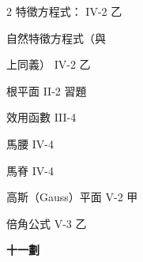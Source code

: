 \begin{multicols}{2}
\noindent 特徵方程式： \hfill IV-2 乙\par
\noindent\hspace*{1.5em} 自然特徵方程式（與\par
\noindent\hspace*{1.5em} 上同義） \hfill IV-2 乙\par
\noindent 根平面 \hfill II-2 習題\par
\noindent 效用函數 \hfill III-4\par
\noindent 馬腰 \hfill IV-4\par
\noindent 馬脊 \hfill IV-4\par
\noindent 高斯（Gauss）平面 \hfill V-2 甲\par
\noindent 倍角公式 \hfill V-3 乙\par

\vspace{0.8em}
\begin{center}
\textbf{\large 十一劃}
\end{center}


\end{multicols}
